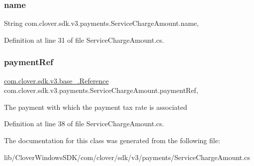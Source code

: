 \subsubsection{\texorpdfstring{name}{name}}
{\footnotesize\ttfamily String com.\+clover.\+sdk.\+v3.\+payments.\+Service\+Charge\+Amount.\+name\hspace{0.3cm}{\ttfamily [get]}, {\ttfamily [set]}}



Definition at line 31 of file Service\+Charge\+Amount.\+cs.

\mbox{\label{classcom_1_1clover_1_1sdk_1_1v3_1_1payments_1_1_service_charge_amount_a374695852cc1abe23dab037151f76b47}} 
\subsubsection{\texorpdfstring{payment\+Ref}{paymentRef}}
{\footnotesize\ttfamily \hyperlink{classcom_1_1clover_1_1sdk_1_1v3_1_1base___1_1_reference}{com.\+clover.\+sdk.\+v3.\+base\+\_\+.\+Reference} com.\+clover.\+sdk.\+v3.\+payments.\+Service\+Charge\+Amount.\+payment\+Ref\hspace{0.3cm}{\ttfamily [get]}, {\ttfamily [set]}}



The payment with which the payment tax rate is associated 



Definition at line 38 of file Service\+Charge\+Amount.\+cs.



The documentation for this class was generated from the following file\+:\begin{DoxyCompactItemize}
\item 
lib/\+Clover\+Windows\+S\+D\+K/com/clover/sdk/v3/payments/Service\+Charge\+Amount.\+cs\end{DoxyCompactItemize}
